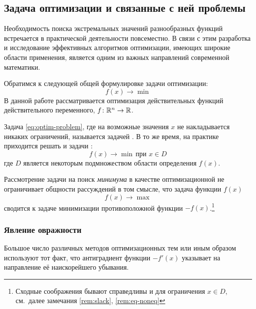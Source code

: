 \subsection{Задача оптимизации и связанные с ней проблемы}

Необходимость поиска экстремальных значений разнообразных функций
встречается в практической деятельности повсеместно. В связи с этим
разработка и исследование эффективных алгоритмов оптимизации, имеющих
широкие области применения, является одним из важных направлений
современной математики.

Обратимся к следующей общей формулировке задачи оптимизации:
\begin{equation}
  \label{eq:optim-problem}
  f(x) \to \min
\end{equation}
В данной работе рассматривается оптимизация действительных функций
действительного переменного, $f\colon \mathbb{R}^n \to \mathbb{R}$.

Задача \eqref{eq:optim-problem}, где на возможные значения $x$ не
накладывается никаких ограничений, называется задачей
. В то же время, на практике
приходится решать и задачи :
\begin{equation}
  \label{eq:optim-problem-c}
  f(x) \to \min\, \text{при } x \in D
\end{equation}
где $D$ является некоторым подмножеством области определения $f(x)$.

\begin{rem}
  Рассмотрение задачи на поиск \emph{минимума} в качестве
  оптимизационной не ограничивает общности рассуждений в том смысле,
  что задача  функции $f(x)$
  \begin{equation*}
    f(x) \to \max
  \end{equation*}
  сводится к задаче минимизации противоположной функции
  $-f(x)$.\footnote[1]{Сходные соображения бывают справедливы и для
    ограничения \mbox{$x \in D$}, см. далее замечания \ref{rem:slack},
    \ref{rem:eq-noneq}}
\end{rem}

\subsubsection{Явление овражности}
\label{sec:problems-ill}

Большое число различных методов оптимизационных тем или иным образом
используют тот факт, что антиградиент функции $-f'(x)$ указывает на
направление её наискорейшего убывания.

